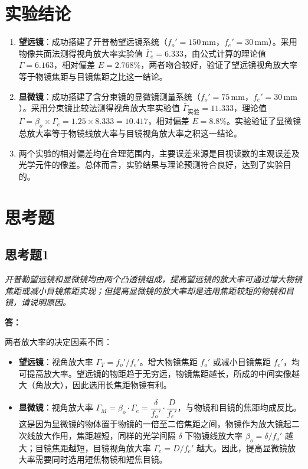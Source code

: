 \documentclass[12pt, a4paper]{article}
\begin{document}
\section{实验结论}

\begin{enumerate}
  \item \textbf{望远镜}：成功搭建了开普勒望远镜系统（$f_o'=150\,\text{mm}$，$f_e'=30\,\text{mm}$）。采用物像共面法测得视角放大率实验值 $\bar{\Gamma}_e = 6.333$，由公式计算的理论值 $\Gamma = 6.163$，相对偏差 $E = 2.768\%$，两者吻合较好，验证了望远镜视角放大率等于物镜焦距与目镜焦距之比这一结论。

  \item \textbf{显微镜}：成功搭建了含分束镜的显微镜测量系统（$f_o'=75\,\text{mm}$，$f_e'=30\,\text{mm}$）。采用分束镜比较法测得视角放大率实验值 $\bar{\Gamma}_{\text{实验}} = 11.333$，理论值 $\Gamma = \beta_o\times\Gamma_e = 1.25\times 8.333 = 10.417$，相对偏差 $E = 8.8\%$。实验验证了显微镜总放大率等于物镜线放大率与目镜视角放大率之积这一结论。

  \item 两个实验的相对偏差均在合理范围内，主要误差来源是目视读数的主观误差及光学元件的像差。总体而言，实验结果与理论预测符合良好，达到了实验目的。
\end{enumerate}

\section{思考题}

\subsection*{思考题1}

\textit{开普勒望远镜和显微镜均由两个凸透镜组成，提高望远镜的放大率可通过增大物镜焦距或减小目镜焦距实现；但提高显微镜的放大率却是选用焦距较短的物镜和目镜，请说明原因。}

\textbf{答：}

两者放大率的决定因素不同：

\begin{itemize}
  \item \textbf{望远镜}：视角放大率 $\Gamma_T = f_o'/f_e'$。增大物镜焦距 $f_o'$ 或减小目镜焦距 $f_e'$，均可提高放大率。望远镜的物距趋于无穷远，物镜焦距越长，所成的中间实像越大（角放大），因此选用长焦距物镜有利。

  \item \textbf{显微镜}：视角放大率 $\Gamma_M = \beta_o\cdot\Gamma_e = \dfrac{\delta}{f_o'}\cdot\dfrac{D}{f_e'}$，与物镜和目镜的焦距均成反比。这是因为显微镜的物体置于物镜的一倍至二倍焦距之间，物镜作为放大镜起二次线放大作用，焦距越短，同样的光学间隔 $\delta$ 下物镜线放大率 $\beta_o = \delta/f_o'$ 越大；目镜焦距越短，目镜视角放大率 $\Gamma_e = D/f_e'$ 越大。因此，提高显微镜放大率需要同时选用短焦物镜和短焦目镜。
\end{itemize}
\end{document}
